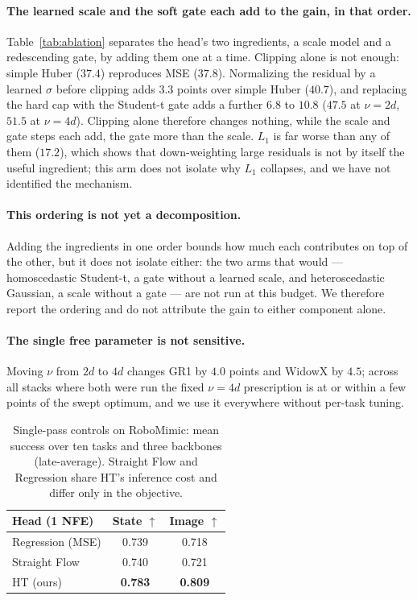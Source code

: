 \paragraph{The learned scale and the soft gate each add to the gain, in that
order.} Table~\ref{tab:ablation} separates the head's two ingredients, a scale
model and a redescending gate, by adding them one at a time. Clipping alone is
not enough: simple Huber ($37.4$) reproduces MSE ($37.8$). Normalizing the
residual by a learned $\sigma$ before clipping adds $3.3$ points over simple
Huber ($40.7$), and replacing the hard cap with the Student-t gate adds a
further $6.8$ to $10.8$ ($47.5$ at $\nu = 2d$, $51.5$ at $\nu = 4d$). Clipping alone therefore
changes nothing, while the scale and gate steps each add, the gate more than the
scale.
$L_1$ is far worse than any of them ($17.2$), which shows that
down-weighting large residuals is not by itself the useful ingredient; this arm
does not isolate why $L_1$ collapses, and we have not identified the
mechanism.

\paragraph{This ordering is not yet a decomposition.} Adding the ingredients in
one order bounds how much each contributes on top of the other, but it does not
isolate either: the two arms that would --- homoscedastic Student-t, a gate
without a learned scale, and heteroscedastic Gaussian, a scale without a gate
--- are not run at this budget. We therefore report the ordering and do not
attribute the gain to either component alone.

\paragraph{The single free parameter is not sensitive.} Moving $\nu$ from $2d$
to $4d$ changes GR1 by $4.0$ points and WidowX by $4.5$; across all stacks
where both were run the fixed $\nu = 4d$ prescription is at or within a few
points of the swept optimum, and we use it everywhere without per-task tuning.

\begin{table}[t]
\centering
\caption{Single-pass controls on RoboMimic: mean success over ten tasks and
three backbones (late-average). Straight Flow and Regression share HT's inference
cost and differ only in the objective.}
\label{tab:singlepass}
\begin{tabular}{lcc}
\toprule
Head (1 NFE) & State $\uparrow$ & Image $\uparrow$ \\
\midrule
Regression (MSE)  & 0.739 & 0.718 \\
Straight Flow     & 0.740 & 0.721 \\
HT (ours)         & \textbf{0.783} & \textbf{0.809} \\
\bottomrule
\end{tabular}
\end{table}

